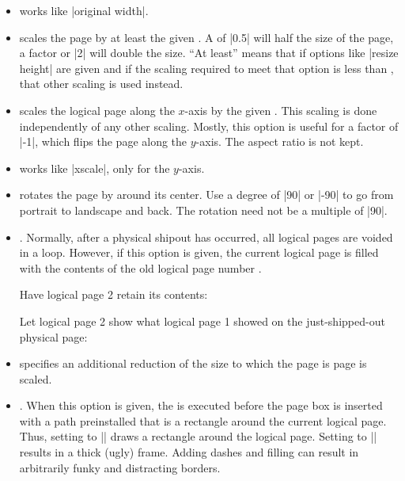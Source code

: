 \begin{command}{\pgfpageslogicalpageoptions{}}
\begin{itemize}
    You need this option only for special logical pages that have
    a height or width different from the normal one and for which you
    will (later on) set these sizes yourself.
  \item
    works like |original width|.
  \item
    scales the page by at least the given . A
     of |0.5| will half the size of the page, a factor or
    |2| will double the size. ``At least'' means that if options like
    |resize height| are given and if the scaling required to meet that
    option is less than , that other scaling is used
    instead.
  \item
    scales the logical page along the $x$-axis by the given
    . This scaling is done independently of any other
    scaling. Mostly, this option is useful for a factor of |-1|, which
    flips the page along the $y$-axis. The aspect ratio is not kept.
  \item
    works like |xscale|, only for the $y$-axis.
  \item
    rotates the page by  around its center. Use a degree
    of |90| or |-90| to go from portrait to landscape and back. The
    rotation need not be a multiple of |90|.
  \item
    .
    Normally, after a physical shipout has occurred, all logical pages
    are voided in a loop. However, if this option is given, the
    current logical page is filled with the contents of the old
    logical page number .

    \example Have logical page 2 retain its contents:
\begin{codeexample}
\end{codeexample}

    \example Let logical page 2 show what logical page 1 showed on the
    just-shipped-out physical page:
\begin{codeexample}
\end{codeexample}
  \item
    specifies an additional reduction of the size to which the page is
    page is scaled.
  \item
    .
    When this option is given, the  is executed before the
    page box is inserted with a path preinstalled that is a rectangle
    around the current logical page. Thus, setting  to
    |\pgfstroke| draws a rectangle around the logical page. Setting
     to |\pgfsetlinewidth{3pt}\pgfstroke| results in a
    thick (ugly) frame. Adding dashes and filling can result in
    arbitrarily funky and distracting borders.


\end{itemize}
\end{command}
